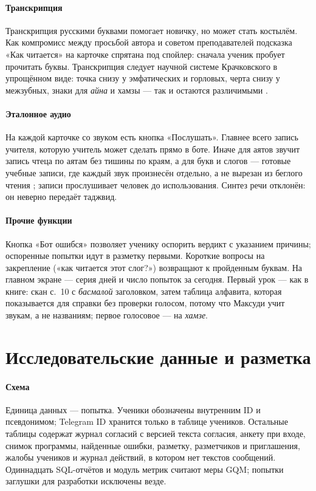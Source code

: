 \paragraph{Транскрипция} Транскрипция русскими буквами помогает новичку, но может стать костылём. Как
компромисс между просьбой автора и советом преподавателей подсказка «Как читается» на карточке спрятана под
спойлер: сначала ученик пробует прочитать буквы. Транскрипция следует научной системе Крачковского в
упрощённом виде: точка снизу у эмфатических и горловых, черта снизу у межзубных, знаки для \emph{айна} и
хамзы --- так  и  остаются различимыми \cite{SRC-051}.

\paragraph{Эталонное аудио} На каждой карточке со звуком есть кнопка «Послушать». Главнее всего запись
учителя, которую учитель может сделать прямо в боте. Иначе для аятов звучит
запись чтеца по аятам \cite{SRC-145} без тишины по краям, а для букв и слогов --- готовые учебные записи,
где каждый звук произнесён отдельно, а не вырезан из беглого чтения \cite{SRC-144}; записи прослушивает
человек до использования. Синтез речи отклонён: он неверно передаёт таджвид.

\paragraph{Прочие функции} Кнопка «Бот ошибся» позволяет ученику оспорить вердикт с указанием причины;
оспоренные попытки идут в разметку первыми. Короткие вопросы на закрепление («как читается этот слог?»)
возвращают к пройденным буквам. На главном экране --- серия дней и число попыток за сегодня. Первый урок ---
как в книге: скан с.~10 с \emph{басмалой} заголовком, затем таблица алфавита, которая показывается для
справки без проверки голосом, потому что Максуди учит звукам, а не названиям; первое голосовое --- на
\emph{хамзе}.

\section{Исследовательские данные и разметка}\label{sec:impl-data}

\paragraph{Схема} Единица данных --- попытка. Ученики обозначены внутренним ID и псевдонимом; Telegram ID
хранится только в таблице учеников. Остальные таблицы содержат журнал согласий с версией текста согласия,
анкету при входе, снимок программы, найденные ошибки, разметку, разметчиков и приглашения, жалобы учеников
и журнал действий, в котором нет текстов сообщений. Одиннадцать SQL-отчётов и модуль метрик считают меры
GQM; попытки заглушки для разработки исключены везде.

